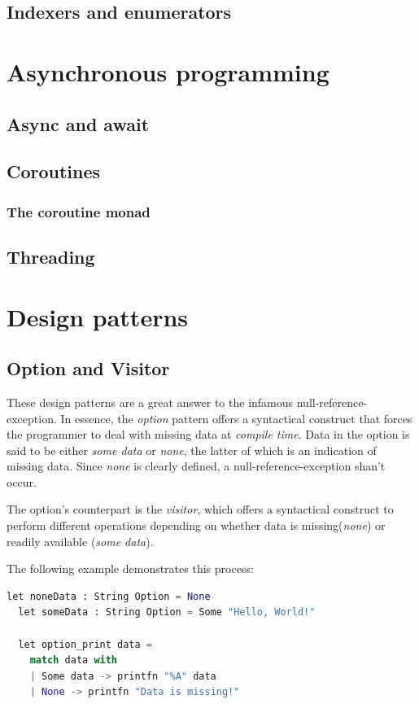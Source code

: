 \documentclass{article}
\begin{document}
\subsection{Indexers and enumerators}

\newpage

\section{Asynchronous programming}
\subsection{Async and await}
\subsection{Coroutines}
\subsubsection{The coroutine monad}
\subsection{Threading}

\newpage

\section{Design patterns}

\subsection{Option and Visitor}
These design patterns are a great answer to the infamous null-reference-exception.
In essence, the {\em option} pattern offers a syntactical construct that forces the programmer to deal with missing data at {\em compile time}.
Data in the option is said to be either {\em some data} or {\em none}, the latter of which is an indication of missing data.
Since {\em none} is clearly defined, a null-reference-exception shan't occur.

The option's counterpart is the {\em visitor}, which offers a syntactical construct to perform different operations depending on whether data
is missing({\em none}) or readily available ({\em some data}).

The following example demonstrates this process:

\begin{lstlisting}[language=Python]
  let noneData : String Option = None
  let someData : String Option = Some "Hello, World!"

  let option_print data =
    match data with
    | Some data -> printfn "%A" data
    | None -> printfn "Data is missing!"
\end{lstlisting}
\end{document}
